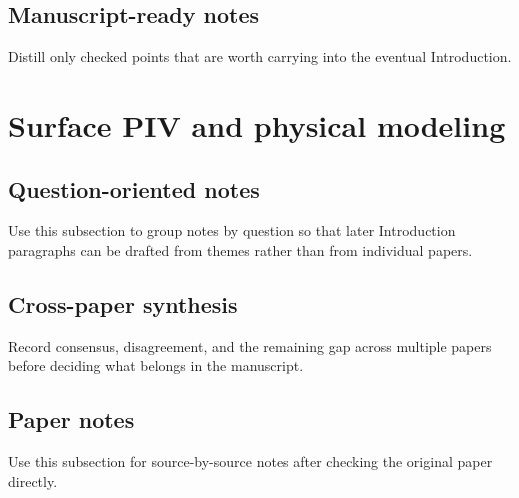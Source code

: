 \documentclass[11pt]{article}
\begin{document}
\subsection{Manuscript-ready notes}
Distill only checked points that are worth carrying into the eventual Introduction.

\section{Surface PIV and physical modeling}

\subsection{Question-oriented notes}
Use this subsection to group notes by question so that later Introduction paragraphs can be drafted from themes rather than from individual papers.

\subsection{Cross-paper synthesis}
Record consensus, disagreement, and the remaining gap across multiple papers before deciding what belongs in the manuscript.

\subsection{Paper notes}
Use this subsection for source-by-source notes after checking the original paper directly.
%
\end{document}
